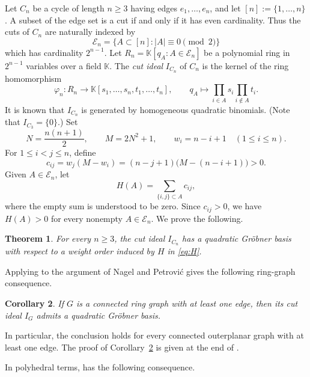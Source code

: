 \documentclass[11pt]{amsart}
\newtheorem{theorem}{Theorem}[section]
\newtheorem{corollary}[theorem]{Corollary}
\theoremstyle{definition}
\newcommand{\kk}{\mathbb K}
\newcommand{\En}{\mathcal E_n}
\numberwithin{equation}{section}
\begin{document}
Let $C_n$ be a cycle of length $n\ge3$ having edges $e_1,\dots,e_n$, and let $[n]:=\{1,\dots,n\}$.
A subset of the edge set is a cut if and only if it has even cardinality. Thus the cuts of $C_n$ are naturally indexed by
\[
\En=\{A\subset[n]: |A|\equiv0\pmod2\}
\]
which has cardinality $2^{n-1}$.
Let $R_n=\kk[q_A:A\in\En]$
be a polynomial ring in $2^{n-1}$ variables over a field $\kk$.
The \textit{cut ideal} $I_{C_n}$ of $C_n$
is the kernel of the ring homomorphism
\begin{equation}\label{eq:cutmap}
 \varphi_n:R_n\longrightarrow
 \kk[s_1,\dots,s_n,t_1,\dots,t_n],
 \qquad
q_A\longmapsto
 \prod_{i\in A}s_i\prod_{i\notin A}t_i.
\end{equation}
It is known that $I_{C_n}$ is generated by homogeneous quadratic binomials.
(Note that $I_{C_3} = \{0\}$.)
Set
\[
N=\frac{n(n+1)}2,
 \qquad
M=2N^2+1,
 \qquad
w_i=n-i+1 \quad (1\le i\le n).
\]
For $1\le i<j\le n$, define
\begin{equation}\label{eq:cij}
c_{ij}=w_j(M-w_i) =(n-j+1)\bigl(M-(n-i+1)
\bigr) >0.
\end{equation}
Given $A \in \En$, let
\begin{equation}\label{eq:H}
H(A)=\sum_{\{i,j\}\subset A}c_{ij}, 
\end{equation}
where the empty sum is understood to be zero. Since $c_{ij}>0$, we have $H(A)>0$ for every nonempty $A\in\mathcal E_n$.
We prove the following.

\begin{theorem}\label{thm:main}
For every $n\ge 3$, the cut ideal $I_{C_n}$ has a quadratic Gr\"obner basis with respect to a weight order induced by $H$ in \eqref{eq:H}.
\end{theorem}

Applying  to the argument of Nagel and Petrovi\'c
\cite[Theorem~6.2]{NagelPetrovic2009}
gives the following ring-graph consequence.


\begin{corollary}\label{cor:ringgraph}
If $G$ is a connected ring graph with at least one edge, then its cut ideal $I_G$ admits a quadratic Gr\"obner basis.
\end{corollary}

In particular, the conclusion holds for every connected outerplanar graph with at least one edge.  The proof of Corollary~\ref{cor:ringgraph} is given at the end of .

In polyhedral terms,  has the following consequence.
\end{document}
